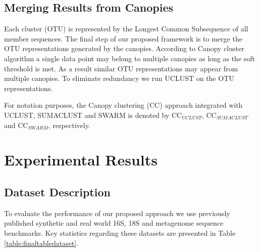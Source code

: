 \documentclass[letterpaper,twocolumn]{article}
\begin{document}
\subsection{Merging Results from Canopies}
Each cluster (OTU) is represented by the Longest Common Subsequence of all member sequences. The final step of 
our proposed framework is to merge the 
OTU representations generated by the 
canopies. According to Canopy cluster algorithm a single data point may
belong to multiple canopies as long as the soft threshold is met. As a result 
similar OTU representations may appear from multiple canopies. To eliminate redundancy we run UCLUST on the 
OTU representations.

For notation purposes, 
the Canopy clustering (CC)  approach 
integrated with UCLUST, SUMACLUST and SWARM 
is denoted by CC$_{UCLUST}$, CC$_{SUMACLUST}$ and CC$_{SWARM}$, respectively. %

\section{Experimental Results}
\label{sec:Experimental}
\subsection{Dataset Description}
To evaluate the performance of our proposed approach we use previously 
published synthetic and real world 16S, 18S and metagenome sequence benchmarks. Key statistics 
regarding these datasets are presented in Table \ref{table:finaltabledataset}. 
\end{document}
